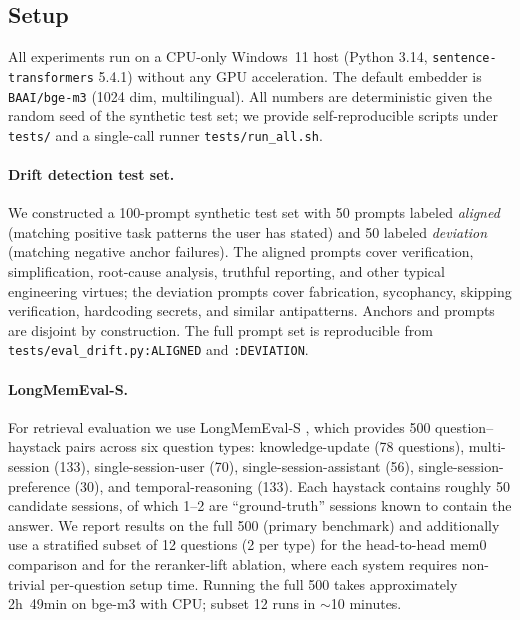 
\subsection{Setup}
\label{sec:eval-setup}

All experiments run on a CPU-only Windows~11 host (Python 3.14,
\texttt{sentence-transformers} 5.4.1) without any GPU
acceleration. The default embedder is \texttt{BAAI/bge-m3}
(1024 dim, multilingual). All numbers are deterministic given
the random seed of the synthetic test set; we provide
self-reproducible scripts under \texttt{tests/} and a single-call
runner \texttt{tests/run\_all.sh}.

\paragraph{Drift detection test set.} We constructed a 100-prompt
synthetic test set with 50 prompts labeled \emph{aligned} (matching
positive task patterns the user has stated) and 50 labeled
\emph{deviation} (matching negative anchor failures). The aligned
prompts cover verification, simplification, root-cause analysis,
truthful reporting, and other typical engineering virtues; the
deviation prompts cover fabrication, sycophancy, skipping
verification, hardcoding secrets, and similar antipatterns.
Anchors and prompts are disjoint by construction. The full prompt
set is reproducible from \texttt{tests/eval\_drift.py:ALIGNED} and
\texttt{:DEVIATION}.

\paragraph{LongMemEval-S.} For retrieval evaluation we use
LongMemEval-S \citep{longmemeval2024}, which provides 500
question--haystack pairs across six question types: knowledge-update
(78 questions), multi-session (133), single-session-user (70),
single-session-assistant (56), single-session-preference (30), and
temporal-reasoning (133). Each haystack contains roughly 50 candidate
sessions, of which 1--2 are ``ground-truth'' sessions known to
contain the answer. We report results on the full 500 (primary
benchmark) and additionally use a stratified subset of 12 questions
(2 per type) for the head-to-head mem0 comparison and for the
reranker-lift ablation, where each system requires non-trivial
per-question setup time. Running the full 500 takes approximately
2h~49min on bge-m3 with CPU; subset 12 runs in $\sim$10 minutes.

